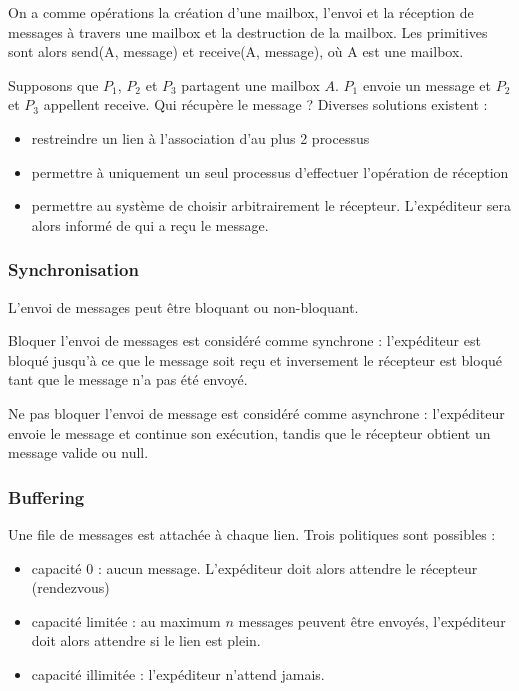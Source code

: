 	On a comme opérations la création d'une mailbox, l'envoi et la réception de messages à travers une mailbox et la destruction de la mailbox. Les primitives sont alors send(A, message) et receive(A, message), où A est une mailbox.
	
	Supposons que $P_1$, $P_2$ et $P_3$ partagent une mailbox $A$. $P_1$ envoie un message et $P_2$ et $P_3$ appellent receive. Qui récupère le message ? Diverses solutions existent :
	
	\begin{itemize}
		\item restreindre un lien à l'association d'au plus 2 processus
		\item permettre à uniquement un seul processus d'effectuer l'opération de réception
		\item permettre au système de choisir arbitrairement le récepteur. L'expéditeur sera alors informé de qui a reçu le message.
	\end{itemize}
	
	
	\subsubsection{Synchronisation}
	
	L'envoi de messages peut être bloquant ou non-bloquant.
	
	Bloquer l'envoi de messages est considéré comme synchrone : l'expéditeur est bloqué jusqu'à ce que le message soit reçu et inversement le récepteur est bloqué tant que le message n'a pas été envoyé.
	
	Ne pas bloquer l'envoi de message est considéré comme asynchrone : l'expéditeur envoie le message et continue son exécution, tandis que le récepteur obtient un message valide ou null.
	
	\subsubsection{Buffering}
	
	Une file de messages est attachée à chaque lien. Trois politiques sont possibles :
	
	\begin{itemize}
		\item capacité 0 : aucun message. L'expéditeur doit alors attendre le récepteur (rendezvous)
		\item capacité limitée : au maximum $n$ messages peuvent être envoyés, l'expéditeur doit alors attendre si le lien est plein.
		\item capacité illimitée : l'expéditeur n'attend jamais.
	\end{itemize}